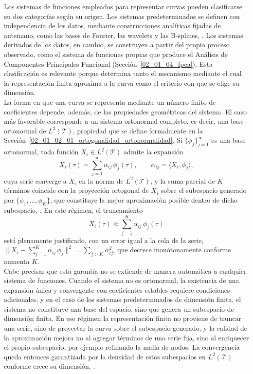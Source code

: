 Los sistemas de funciones empleados para representar curvas pueden clasificarse en dos categorías según su origen. Los sistemas predeterminados se definen con independencia de los datos, mediante construcciones analíticas fijadas de antemano, como las bases de Fourier, las wavelets y las B-splines, \cite{02_01_ramsay2006functional}. Los sistemas derivados de los datos, en cambio, se construyen a partir del propio proceso observado, como el sistema de funciones propias que produce el Análisis de Componentes Principales Funcional (Sección~\ref{02_01_04_fpca}). Esta clasificación es relevante porque determina tanto el mecanismo mediante el cual la representación finita aproxima a la curva como el criterio con que se elige su dimensión.\\

La forma en que una curva se representa mediante un número finito de coeficientes depende, además, de las propiedades geométricas del sistema. El caso más favorable corresponde a un sistema ortonormal completo, es decir, una base ortonormal de $L^2(\mathcal{T})$, propiedad que se define formalmente en la Sección~\ref{02_01_02_01_ortogonalidad_ortonormalidad}. Si $\{\phi_j\}_{j=1}^{\infty}$ es una base ortonormal, toda función $X_i \in L^2(\mathcal{T})$ admite la expansión
\begin{equation}
    X_i(\tau) = \sum_{j=1}^{\infty} \alpha_{ij}\, \phi_j(\tau),
    \qquad \alpha_{ij} = \langle X_i, \phi_j \rangle,
\end{equation}
cuya serie converge a $X_i$ en la norma de $L^2(\mathcal{T})$, y la suma parcial de $K$ términos coincide con la proyección ortogonal de $X_i$ sobre el subespacio generado por $\{\phi_1, \dots, \phi_K\}$, que constituye la mejor aproximación posible dentro de dicho subespacio, \cite{02_01_kokoszka2017introduction}. En este régimen, el truncamiento
\begin{equation}
    X_i(\tau) \approx \sum_{j=1}^{K} \alpha_{ij}\, \phi_j(\tau)
\end{equation}
está plenamente justificado, con un error igual a la cola de la serie, $\bigl\| X_i - \sum_{j=1}^{K}\alpha_{ij}\,\phi_j \bigr\|^2 = \sum_{j>K}\alpha_{ij}^2$, que decrece monótonamente conforme aumenta $K$.\\

Cabe precisar que esta garantía no se extiende de manera automática a cualquier sistema de funciones. Cuando el sistema no es ortonormal, la existencia de una expansión única y convergente con coeficientes estables requiere condiciones adicionales, y en el caso de los sistemas predeterminados de dimensión finita, el sistema no constituye una base del espacio, sino que genera un subespacio de dimensión finita. En ese régimen la representación finita no proviene de truncar una serie, sino de proyectar la curva sobre el subespacio generado, y la calidad de la aproximación mejora no al agregar términos de una serie fija, sino al enriquecer el propio subespacio, por ejemplo refinando la malla de nodos. La convergencia queda entonces garantizada por la densidad de estos subespacios en $L^2(\mathcal{T})$ conforme crece su dimensión, \cite{02_01_deboor2001practical}.\\

